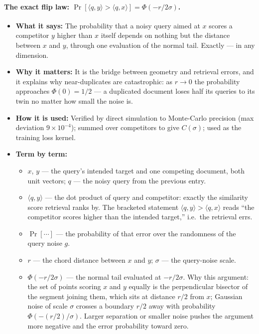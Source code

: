 \documentclass[11pt,letterpaper]{article}
\begin{document}
\paragraph{The exact flip law: $\Pr[\langle q, y \rangle > \langle q, x
\rangle] = \Phi(-r / 2\sigma)$.}
\begin{itemize}
  \item \textbf{What it says:} The probability that a noisy query aimed at
  $x$ scores a competitor $y$ higher than $x$ itself depends on nothing but
  the distance between $x$ and $y$, through one evaluation of the normal
  tail. Exactly --- in any dimension.
  \item \textbf{Why it matters:} It is the bridge between geometry and
  retrieval errors, and it explains why near-duplicates are catastrophic:
  as $r \to 0$ the probability approaches $\Phi(0) = 1/2$ --- a duplicated
  document loses half its queries to its twin no matter how small the
  noise is.
  \item \textbf{How it is used:} Verified by direct simulation to
  Monte-Carlo precision (max deviation $9 \times 10^{-4}$); summed over
  competitors to give $C(\sigma)$; used as the training loss kernel.
  \item \textbf{Term by term:}
  \begin{itemize}
    \item $x$, $y$ --- the query's intended target and one competing
    document, both unit vectors; $q$ --- the noisy query from the previous
    entry.
    \item $\langle q, y \rangle$ --- the dot product of query and
    competitor: exactly the similarity score retrieval ranks by. The
    bracketed statement $\langle q, y\rangle > \langle q, x\rangle$ reads
    ``the competitor scores higher than the intended target,'' i.e.\ the
    retrieval errs.
    \item $\Pr[\cdots]$ --- the probability of that error over the
    randomness of the query noise $g$.
    \item $r$ --- the chord distance between $x$ and $y$; $\sigma$ --- the
    query-noise scale.
    \item $\Phi(-r/2\sigma)$ --- the normal tail evaluated at
    $-r/2\sigma$. Why this argument: the set of points scoring $x$ and $y$
    equally is the perpendicular bisector of the segment joining them,
    which sits at distance $r/2$ from $x$; Gaussian noise of scale $\sigma$
    crosses a boundary $r/2$ away with probability $\Phi(-(r/2)/\sigma)$.
    Larger separation or smaller noise pushes the argument more negative
    and the error probability toward zero.
  \end{itemize}
\end{itemize}
\end{document}

